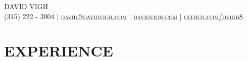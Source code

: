 \documentclass[letterpaper,11pt]{article}
\begin{document}
\thispagestyle{fancy}
\fancyhf{} %
\fancyheadoffset[R]{-0.1cm}

\begin{center}
    \Huge \scshape DAVID VIGH \\ \vspace{1pt}
    \small (315) 222 - 3004 $|$ 
    \href{mailto:david@davidvigh.com}{david@davidvigh.com} $|$ 
    \href{https://www.davidvigh.com/}{davidvigh.com} $|$
    \href{https://github.com/dvigh8}{github.com/dvigh8} \\ \vspace{-5pt}
\end{center}


\section{\textbf{EXPERIENCE}}
\end{document}
